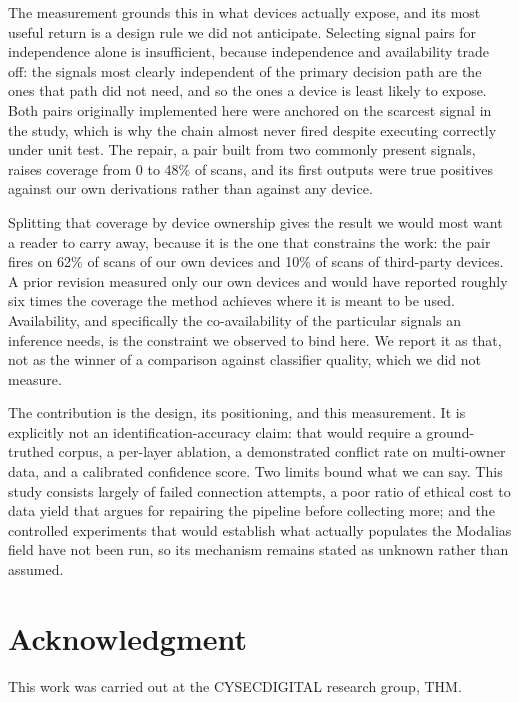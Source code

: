 \documentclass[conference]{IEEEtran}
\begin{document}
The measurement grounds this in what devices actually expose, and its most
useful return is a design rule we did not anticipate. Selecting signal pairs
for independence alone is insufficient, because independence and availability
trade off: the signals most clearly independent of the primary decision path
are the ones that path did not need, and so the ones a device is least likely
to expose. Both pairs originally implemented here were anchored on the
scarcest signal in the study, which is why the chain almost never fired
despite executing correctly under unit test. The repair, a pair built from two
commonly present signals, raises coverage from 0 to 48\% of scans, and its
first outputs were true positives against our own derivations rather than
against any device.

Splitting that coverage by device ownership gives the result we would most
want a reader to carry away, because it is the one that constrains the work:
the pair fires on 62\% of scans of our own devices and 10\% of scans of
third-party devices. A prior revision measured only our own devices and would
have reported roughly six times the coverage the method achieves where it is
meant to be used. Availability, and specifically the co-availability of the
particular signals an inference needs, is the constraint we observed to bind
here. We report it as that, not as the winner of a comparison against
classifier quality, which we did not measure.

The contribution is the design, its positioning, and this measurement. It is
explicitly not an identification-accuracy claim: that would require a
ground-truthed corpus, a per-layer ablation, a demonstrated conflict rate on
multi-owner data, and a calibrated confidence score. Two limits bound what we
can say. This study consists largely of failed connection attempts, a poor
ratio of ethical cost to data yield that argues for repairing the pipeline
before collecting more; and the controlled experiments that would establish
what actually populates the Modalias field have not been run, so its mechanism
remains stated as unknown rather than assumed.

\section*{Acknowledgment}
This work was carried out at the CYSECDIGITAL research group, THM.
\end{document}
